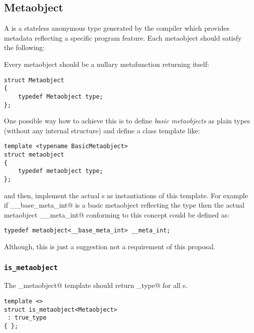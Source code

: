 \subsection{Metaobject}
\label{concept-Metaobject}


A  is a stateless anonymous type generated by the compiler which
provides metadata reflecting a specific program feature. Each metaobject
should satisfy the following:

Every metaobject should be a nullary metafunction returning itself:

\begin{verbatim}
struct Metaobject
{
	typedef Metaobject type;
};
\end{verbatim}

One possible way how to achieve this is to define {\em basic metaobjects}
as plain types (without any internal structure) and define a class template like:

\begin{verbatim}
template <typename BasicMetaobject>
struct metaobject
{
	typedef metaobject type;
};
\end{verbatim}

and then, implement the actual s as instantiations of this template.
For example if \verb@__base_meta_int@ is a basic metaobject reflecting the \verb@int@
type then the actual metaobject \verb@__meta_int@ conforming to this concept could 
be defined as:

\begin{verbatim}
typedef metaobject<__base_meta_int> __meta_int;
\end{verbatim}

Although, this is just a suggestion not a requirement of this proposal.

\subsubsection{\texttt{is\_metaobject}}

The \verb@is_metaobject@ template should return \verb@true_type@ for all s.

\begin{verbatim}
template <>
struct is_metaobject<Metaobject>
 : true_type
{ };
\end{verbatim}

